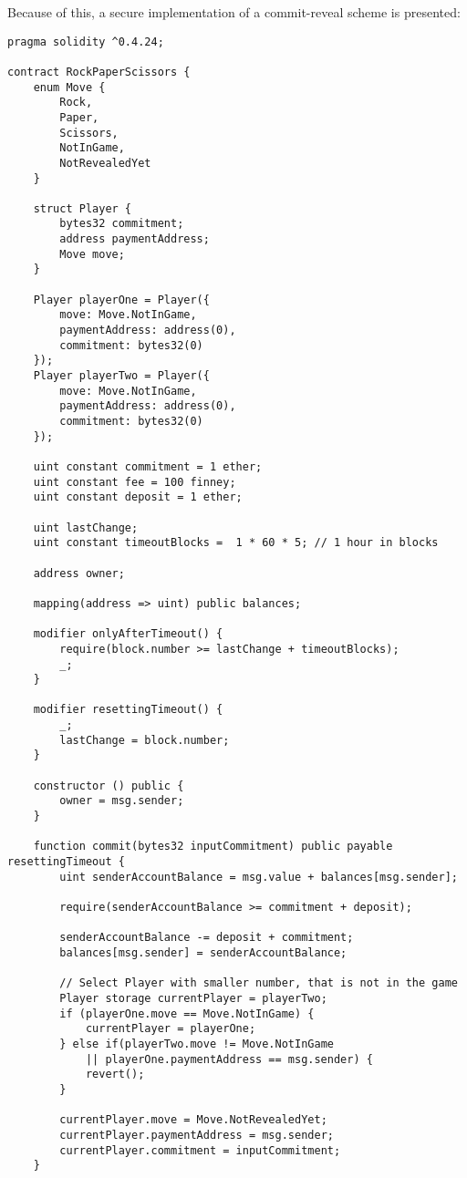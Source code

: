 Because of this, a secure implementation of a commit-reveal scheme is presented:
\begin{verbatim}
pragma solidity ^0.4.24;

contract RockPaperScissors {
    enum Move {
        Rock,
        Paper,
        Scissors,
        NotInGame,
        NotRevealedYet
    }
    
    struct Player {
        bytes32 commitment;
        address paymentAddress;
        Move move;
    }
    
    Player playerOne = Player({
        move: Move.NotInGame,
        paymentAddress: address(0),
        commitment: bytes32(0)
    });
    Player playerTwo = Player({
        move: Move.NotInGame,
        paymentAddress: address(0),
        commitment: bytes32(0)
    });

    uint constant commitment = 1 ether;
    uint constant fee = 100 finney;
    uint constant deposit = 1 ether;

    uint lastChange;
    uint constant timeoutBlocks =  1 * 60 * 5; // 1 hour in blocks
    
    address owner;
    
    mapping(address => uint) public balances;
    
    modifier onlyAfterTimeout() {
        require(block.number >= lastChange + timeoutBlocks);
        _;
    }
    
    modifier resettingTimeout() {
        _;
        lastChange = block.number;
    }

    constructor () public {
        owner = msg.sender;
    }
    
    function commit(bytes32 inputCommitment) public payable resettingTimeout {
        uint senderAccountBalance = msg.value + balances[msg.sender];

        require(senderAccountBalance >= commitment + deposit);
        
        senderAccountBalance -= deposit + commitment;
        balances[msg.sender] = senderAccountBalance;
        
        // Select Player with smaller number, that is not in the game
        Player storage currentPlayer = playerTwo;
        if (playerOne.move == Move.NotInGame) {
            currentPlayer = playerOne;
        } else if(playerTwo.move != Move.NotInGame
            || playerOne.paymentAddress == msg.sender) {
            revert();
        }
        
        currentPlayer.move = Move.NotRevealedYet;
        currentPlayer.paymentAddress = msg.sender;
        currentPlayer.commitment = inputCommitment;
    }
    

\end{verbatim}
